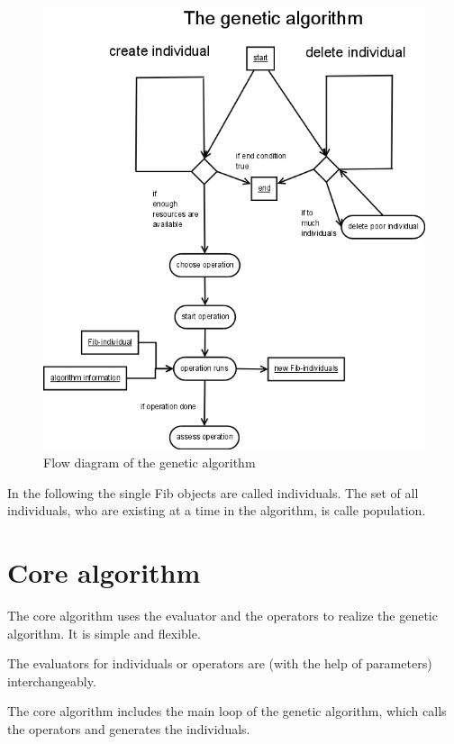 \begin{figure}[htbp]
\begin{center}
  \includegraphics[scale=0.4]{algorithmus}
\end{center}
\caption{Flow diagram of the genetic algorithm}
\label{figGeneticAlgorithmus}
\end{figure}

In the following the single Fib objects are called individuals. The set of all individuals, who are existing at a time in the algorithm, is calle population.


\section{Core algorithm}

The core algorithm uses the evaluator and the operators to realize the genetic algorithm. It is simple and flexible.

The evaluators for individuals or operators are (with the help of parameters) interchangeably.

\bigskip
The core algorithm includes the main loop of the genetic algorithm, which calls the operators and generates the individuals.

